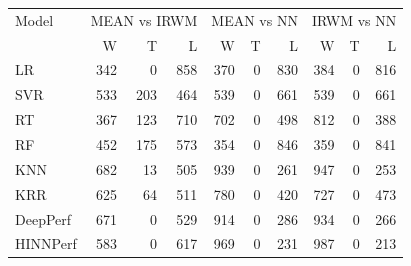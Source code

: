 \begin{tabular}{lrrrrrrrrr}
\toprule
Model & \multicolumn{3}{c}{MEAN vs IRWM} & \multicolumn{3}{c}{MEAN vs NN} & \multicolumn{3}{c}{IRWM vs NN} \\
& W & T & L & W & T & L & W & T & L \\
\midrule
LR & 342 & 0 & 858 & 370 & 0 & 830 & 384 & 0 & 816 \\
SVR & 533 & 203 & 464 & 539 & 0 & 661 & 539 & 0 & 661 \\
RT & 367 & 123 & 710 & 702 & 0 & 498 & 812 & 0 & 388 \\
RF & 452 & 175 & 573 & 354 & 0 & 846 & 359 & 0 & 841 \\
KNN & 682 & 13 & 505 & 939 & 0 & 261 & 947 & 0 & 253 \\
KRR & 625 & 64 & 511 & 780 & 0 & 420 & 727 & 0 & 473 \\
DeepPerf & 671 & 0 & 529 & 914 & 0 & 286 & 934 & 0 & 266 \\
HINNPerf & 583 & 0 & 617 & 969 & 0 & 231 & 987 & 0 & 213 \\
\bottomrule
\end{tabular}
